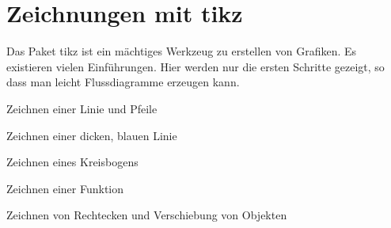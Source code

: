 
%
%

\chapter{Zeichnungen mit tikz}


Das Paket tikz ist ein mächtiges Werkzeug zu erstellen von Grafiken. Es existieren vielen Einführungen. Hier werden nur die ersten Schritte gezeigt, so dass man leicht Flussdiagramme erzeugen kann.

\bigskip

Zeichnen einer Linie und Pfeile



\medskip



\bigskip

Zeichnen einer dicken, blauen Linie



\medskip



\bigskip

Zeichnen eines Kreisbogens



\medskip



\bigskip

Zeichnen einer Funktion



\medskip



\bigskip

Zeichnen von Rechtecken und Verschiebung von Objekten



\medskip



\bigskip


